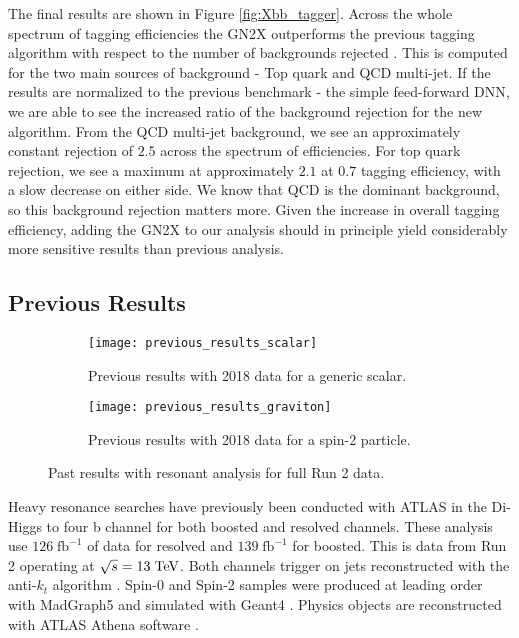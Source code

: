 \documentclass[12pt]{article}
\begin{document}
The final results are shown in Figure \ref{fig:Xbb_tagger}. Across the whole
spectrum of tagging efficiencies the GN2X outperforms the previous tagging
algorithm with respect to the number of backgrounds rejected
\cite{boosted_hbbcc_tagger}. This is computed for the two main sources of
background - Top quark and QCD multi-jet. If the results are normalized to the
previous benchmark - the simple feed-forward DNN, we are able to see the
increased ratio of the background rejection for the new algorithm. From the QCD
multi-jet background, we see an approximately constant rejection of $2.5$ across
the spectrum of efficiencies. For top quark rejection, we see a maximum at
approximately $2.1$ at $0.7$ tagging efficiency, with a slow decrease on either
side. We know that QCD is the dominant background, so this background rejection
matters more. Given the increase in overall tagging efficiency, adding the GN2X
to our analysis should in principle yield considerably more sensitive results
than previous analysis.

\subsection{Previous Results}
\begin{figure}[t]
    \centering
    \begin{subfigure}[t]{.48\textwidth}
        \centering
        \texttt{[image: previous\_results\_scalar]}
        \caption{Previous results with 2018 data for a generic scalar.}
        \label{subfig:previous_results_scalar}
    \end{subfigure}
    \hfill
    \begin{subfigure}[t]{.48\textwidth}
        \centering
        \texttt{[image: previous\_results\_graviton]}
        \caption{Previous results with 2018 data for a spin-2 particle.}
        \label{subfig:previous_results_graviton}
    \end{subfigure}
\caption{Past results with resonant analysis for full Run 2 data.}
\label{fig:previous_results}
\end{figure}

Heavy resonance searches have previously been conducted with ATLAS in the Di-Higgs
to four b channel for both boosted and resolved channels. These analysis use
$126\;\text{fb}^{-1}$ of data for resolved and $139\;\text{fb}^{-1}$ for boosted.
This is data from Run 2 operating at $\sqrt{s}=13\;\text{TeV}$. Both channels
trigger on jets reconstructed with the anti-$k_t$ algorithm \cite{antikt}.
Spin-0 and Spin-2 samples were produced at leading order with MadGraph5
\cite{madgraph5_OG} and simulated with Geant4 \cite{geant4}. Physics objects are
reconstructed with ATLAS Athena software \cite{atlas_simulation}.
\end{document}
